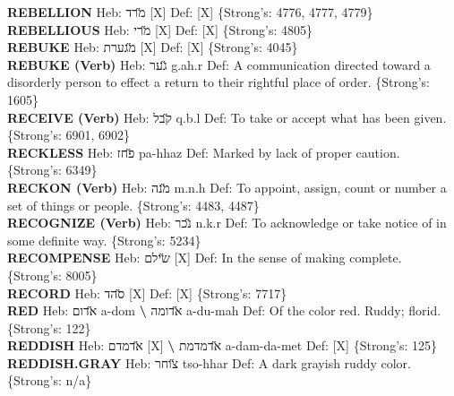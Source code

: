 {\textbf{REBELLION} Heb: {\large\H מרד} {[}X{]} Def: {[}X{]} \{Strong's: 4776, 4777, 4779\}\hfill{}\\

\textbf{REBELLIOUS} Heb: {\large\H מרי} {[}X{]} Def: {[}X{]} \{Strong's: 4805\}\hfill{}\\

\textbf{REBUKE} Heb: {\large\H מגערת} {[}X{]} Def: {[}X{]} \{Strong's: 4045\}\hfill{}\\

\textbf{REBUKE (Verb)} Heb: {\large\H גער} g.ah.r Def: A communication directed toward a disorderly person to effect a return to their rightful place of order. \{Strong's: 1605\}\hfill{}\\

\textbf{RECEIVE (Verb)} Heb: {\large\H קבל} q.b.l Def: To take or accept what has been given. \{Strong's: 6901, 6902\}\hfill{}\\

\textbf{RECKLESS} Heb: {\large\H פחז} pa-hhaz Def: Marked by lack of proper caution. \{Strong's: 6349\}\hfill{}\\

\textbf{RECKON (Verb)} Heb: {\large\H מנה} m.n.h Def: To appoint, assign, count or number a set of things or people. \{Strong's: 4483, 4487\}\hfill{}\\

\textbf{RECOGNIZE (Verb)} Heb: {\large\H נכר} n.k.r Def: To acknowledge or take notice of in some definite way. \{Strong's: 5234\}\hfill{}\\

\textbf{RECOMPENSE} Heb: {\large\H שילם} {[}X{]} Def: In the sense of making complete. \{Strong's: 8005\}\hfill{}\\

\textbf{RECORD} Heb: {\large\H סהד} {[}X{]} Def: {[}X{]} \{Strong's: 7717\}\hfill{}\\

\textbf{RED} Heb: {\large\H אדום} a-dom \textbf{\textbackslash{}} {\large\H אדומה} a-du-mah Def: Of the color red. Ruddy; florid. \{Strong's: 122\}\hfill{}\\

\textbf{REDDISH} Heb: {\large\H אדמדם} {[}X{]} \textbf{\textbackslash{}} {\large\H אדמדמת} a-dam-da-met Def: {[}X{]} \{Strong's: 125\}\hfill{}\\

\textbf{REDDISH.GRAY} Heb: {\large\H צוחר} tso-hhar Def: A dark grayish ruddy color. \{Strong's: n/a\}\hfill{}\\

}
